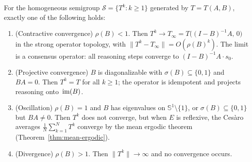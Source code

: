 \begin{theorem}\label{thm:classification}
  For the homogeneous semigroup $\mathcal{S}=\{T^k:k\geq 1\}$ generated by
  $T=T(A,B)$, exactly one of the following holds:

  \begin{enumerate}[label=\textup{Case~\arabic*},leftmargin=3.5em]
    \item \textup{(Contractive convergence)} $\rho(B)<1$. Then
      $T^k\to T_\infty=T\bigl((I-B)^{-1}A,\,0\bigr)$ in the strong operator
      topology, with $\|T^k-T_\infty\|=O(\rho(B)^k)$. The limit is a
      consensus operator: all reasoning steps converge to $(I-B)^{-1}A\cdot
      s_0$.

    \item \textup{(Projective convergence)} $B$ is diagonalizable with
      $\sigma(B)\subseteq\{0,1\}$ and $BA=0$. Then $T^k=T$ for all $k\geq 1$;
      the operator is idempotent and projects reasoning onto~$\operatorname{im}(B)$.

    \item \textup{(Oscillation)} $\rho(B)=1$ and $B$ has eigenvalues on
      $\mathbb{S}^1\setminus\{1\}$, or $\sigma(B)\subseteq\{0,1\}$ but
      $BA\neq 0$. Then $T^k$ does not converge, but when $E$ is reflexive,
      the Ces\`aro averages
      $\frac{1}{N}\sum_{k=1}^{N}T^k$ converge by the mean ergodic theorem
      \textup{(Theorem~\ref{thm:mean-ergodic})}.

    \item \textup{(Divergence)} $\rho(B)>1$. Then
      $\|T^k\|\to\infty$ and no convergence occurs.
  \end{enumerate}
\end{theorem}

